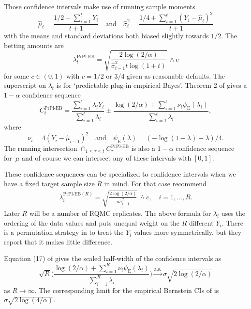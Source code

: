 \documentclass{article}
\newcommand{\art}[1]{\begingroup\color{blue}#1\endgroup}
\renewcommand{\le}{\leqslant}
\newcommand{\e}{\mathbb{E}}
\newcommand{\toas}{\stackrel{\mathrm{a.s.}}{\to}}
\newcommand{\giv}{\!\mid\!} %
\newcommand{\prpleb}{\text{PrPl-EB}}
\newcommand{\eb}{\mathrm{E}}
\begin{document}
Those confidence intervals make use of running sample moments
$$
\hat\mu_t = \frac{1/2+\sum_{i=1}^tY_i}{t+1}
\quad\text{and}\quad
\hat\sigma^2_t = \frac{1/4+\sum_{i=1}^t(Y_i-\hat\mu_i)^2}{t+1}
$$
with the means and standard deviations 
both biased slightly towards $1/2$.
The betting amounts are
$$
\lambda_t^\prpleb = \sqrt{\frac{2\log(2/\alpha)}{\hat\sigma^2_{t-1}t\log(1+t)}}\,\wedge c
$$
for some $c\in(0,1)$ with $c=1/2$ or $3/4$
given as reasonable defaults. The superscript on $\lambda_t$ 
is for `predictable plug-in empirical Bayes'.
Theorem 2 of \cite{WauRam24a} 
gives a $1-\alpha$ confidence sequence
$$
C_t^\prpleb = \frac{\sum_{i=1}^t\lambda_iY_i}{\sum_{i=1}^t\lambda_i}
\pm \frac{\log(2/\alpha)+\sum_{i=1}^t\nu_i\psi_{\eb}(\lambda_i)}{\sum_{i=1}^t\lambda_i},
$$
where
$$
\nu_i = 4(Y_i-\hat\mu_{i-1})^2
\quad\text{and}\quad \psi_{\eb}(\lambda)
= (-\log(1-\lambda)-\lambda)/4.
$$
The running intersection
$\cap_{1\le\tau\le t}C^\prpleb_\tau$
is also a $1-\alpha$ confidence sequence for~$\mu$ and
of course we can intersect any of these intervals with $[0,1]$.

These confidence sequences can be specialized to confidence
intervals when we have a fixed target sample size $R$
in mind.  For that case \cite{WauRam24a}
recommend
\begin{align}\label{eq:purplelambda}
\lambda_i^{\prpleb(R)} = \sqrt{\frac{2\log(2/\alpha)}{n\hat\sigma^2_{i-1}}}\,\wedge c,\quad i=1,\dots,R.
\end{align}
Later $R$ will be a number of RQMC replicates.
The above formula for $\lambda_i$ uses the ordering
of the data values and puts unequal weight on the
$R$ different $Y_i$. There is a permutation strategy
in \cite{WauRam24a} to treat the $Y_i$ values more
symmetrically, but they report that it makes little difference.

Equation (17) of \cite{WauRam24a} gives the
scaled half-width of the \prpleb{} confidence intervals as
$$
\sqrt{R}\biggl(\frac{\log(2/\alpha)+\sum_{i=1}^R\nu_i\psi_\eb(\lambda_i)}{\sum_{i=1}^R\lambda_i} \biggr)\toas \sigma\sqrt{2\log(2/\alpha)}
$$
as $R\to\infty$.  The corresponding limit for the empirical
Bernstein CIs of \cite{maurer2009empirical}
is $\sigma\sqrt{2\log(4/\alpha)}$.

\end{document}
